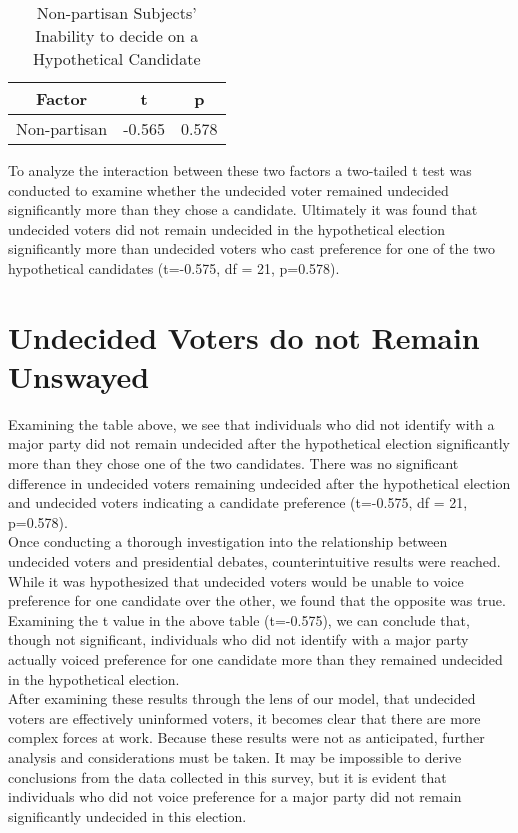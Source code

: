 \documentclass[12pt]{article}
\begin{document}
{{{{\begin{table}[h]
\caption{Non-partisan Subjects' Inability to decide on a Hypothetical Candidate}
\centering
 \begin{tabular}{||c c c||}
 \hline
 Factor & t & p \\ [0.5ex]
 \hline\hline
 Non-partisan & -0.565 & 0.578 \\ [1ex]
 \hline
 \end{tabular}

 \end{table}
 
To analyze the interaction between these two factors a two-tailed t test was conducted to examine whether the undecided voter remained undecided significantly more than they chose a candidate. Ultimately it was found that undecided voters did not remain undecided in the hypothetical election significantly more than undecided voters who cast preference for one of the two hypothetical candidates (t=-0.575, df = 21, p=0.578).\\

\section*{Undecided Voters do not Remain Unswayed}

Examining the table above, we see that individuals who did not identify with a major party did not remain undecided after the hypothetical election significantly more than they chose one of the two candidates. There was no significant difference in undecided voters remaining undecided after the hypothetical election and undecided voters indicating a candidate preference (t=-0.575, df = 21, p=0.578).\\

Once conducting a thorough investigation into the relationship between undecided voters and presidential debates, counterintuitive results were reached. While it was hypothesized that undecided voters would be unable to voice preference for one candidate over the other, we found that the opposite was true. Examining the t value in the above table (t=-0.575), we can conclude that, though not significant, individuals who did not identify with a major party actually voiced preference for one candidate more than they remained undecided in the hypothetical election. \\

After examining these results through the lens of our model, that undecided voters are effectively uninformed voters, it becomes clear that there are more complex forces at work. Because these results were not as anticipated, further analysis and considerations must be taken. It may be impossible to derive conclusions from the data collected in this survey, but it is evident that individuals who did not voice preference for a major party did not remain significantly undecided in this election. \\

}}}}
\end{document}
